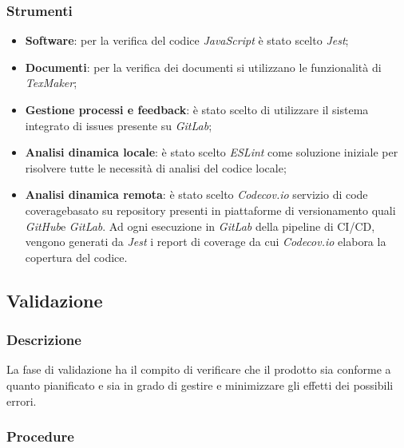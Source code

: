 \subsubsection{Strumenti}
\begin{itemize}
	\item \textbf{Software}: per la verifica del codice \textit{JavaScript} è stato scelto \textit{Jest};
	\item \textbf{Documenti}: per la verifica dei documenti si utilizzano le funzionalità di \textit{TexMaker};
	\item \textbf{Gestione processi e feedback}: è stato scelto di utilizzare il sistema integrato di issues presente su \textit{GitLab};
	\item \textbf{Analisi dinamica locale}: è stato scelto \textit{ESLint} come soluzione iniziale per risolvere tutte le necessità di analisi del codice locale;
	\item \textbf{Analisi dinamica remota}:	è stato scelto \textit{Codecov.io} servizio di code coverage\glossario basato su repository presenti in piattaforme di versionamento quali \textit{GitHub}\glossario e \textit{GitLab}. Ad ogni esecuzione in \textit{GitLab} della pipeline di CI/CD, vengono generati da \textit{Jest} i report di coverage da cui \textit{Codecov.io} elabora la copertura del codice.
\end{itemize}

\subsection{Validazione}\label{validazione}
\subsubsection{Descrizione}
La fase di validazione ha il compito di verificare che il prodotto sia conforme a quanto pianificato e sia in grado di gestire e minimizzare gli effetti dei possibili errori.
\subsubsection{Procedure}
